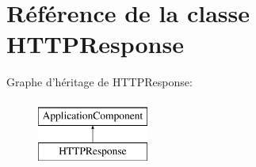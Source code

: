 \hypertarget{class_library_1_1_h_t_t_p_response}{\section{Référence de la classe H\+T\+T\+P\+Response}
\label{class_library_1_1_h_t_t_p_response}
}
Graphe d'héritage de H\+T\+T\+P\+Response\+:\begin{figure}[H]
\begin{center}
\leavevmode
\includegraphics[height=2.000000cm]{class_library_1_1_h_t_t_p_response}
\end{center}
\end{figure}

